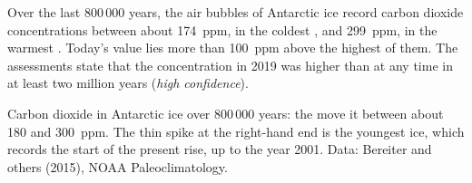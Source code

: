 \begin{proposition}\label{prop:g12:climate-change:icecore}
Over the last 800\,000 years, the air bubbles of Antarctic ice record
carbon dioxide concentrations between about \qty{174}{ppm}, in the coldest
, and \qty{299}{ppm}, in the warmest . Today's
value lies more than \qty{100}{ppm} above the highest of them. The
assessments state that the concentration in 2019 was higher than at any time
in at least two million years (\emph{high confidence}).
\end{proposition}

\begin{omfigure}

{\small Carbon dioxide in Antarctic ice over 800\,000 years: the  move it between about 180 and \qty{300}{ppm}. The thin spike at the
right-hand end is the youngest ice, which records the start of the present
rise, up to the year 2001. Data: Bereiter and others (2015), NOAA
Paleoclimatology.}
\end{omfigure}

